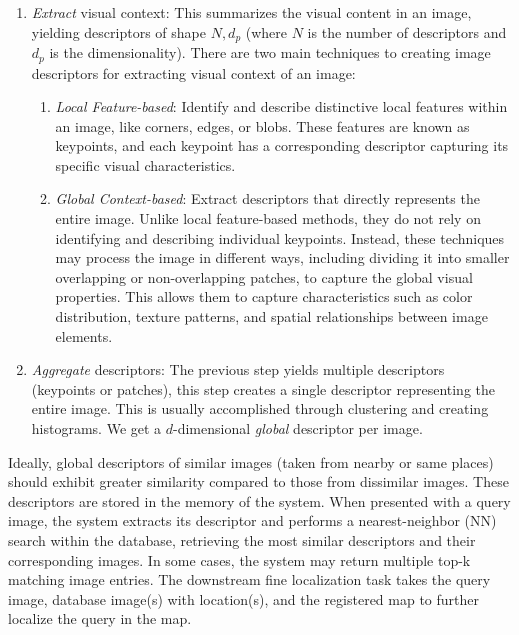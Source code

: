 \begin{enumerate}
    \item \emph{Extract} visual context: This summarizes the visual
    content in an image, yielding descriptors of shape $N, d_p$ (where
    $N$ is the number of descriptors and $d_p$ is the dimensionality).
    There are two main techniques to creating image descriptors for
    extracting visual context of an image:
    \begin{enumerate}
        \item \emph{Local Feature-based}: Identify and describe
        distinctive local features within an image, like corners,
        edges, or blobs. These features are known as keypoints, and
        each keypoint has a corresponding descriptor capturing its
        specific visual characteristics.
        \item \emph{Global Context-based}: Extract descriptors that
        directly represents the entire image. Unlike local
        feature-based methods, they do not rely on identifying and
        describing individual keypoints. Instead, these techniques may
        process the image in different ways, including dividing it
        into smaller overlapping or non-overlapping patches, to
        capture the global visual properties. This allows them to
        capture characteristics such as color distribution, texture
        patterns, and spatial relationships between image elements.
    \end{enumerate}
    \item \emph{Aggregate} descriptors: The previous step yields
    multiple descriptors (keypoints or patches), this step creates a
    single descriptor representing the entire image.  This is usually
    accomplished through clustering and creating histograms. We get
    a $d$-dimensional \emph{global} descriptor per image.
\end{enumerate}

Ideally, global descriptors of similar images (taken from nearby or
same places) should exhibit greater similarity compared to those from
dissimilar images. These descriptors are stored in the memory of the
system. When presented with a query image, the system extracts its
descriptor and performs a nearest-neighbor (NN) search within the
database, retrieving the most similar descriptors and their
corresponding images. In some cases, the system may return multiple
top-k matching image entries. The downstream fine localization task
takes the query image, database image(s) with location(s), and the
registered map to further localize the query in the map.

